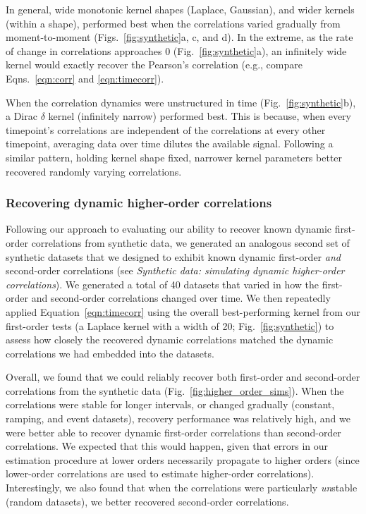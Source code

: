 \documentclass[english]{article}
\begin{document}
In general, wide monotonic kernel shapes (Laplace, Gaussian), and
wider kernels (within a shape), performed best when the correlations
varied gradually from moment-to-moment (Figs.~\ref{fig:synthetic}a, c,
and d).  In the extreme, as the rate of change in correlations
approaches 0 (Fig.~\ref{fig:synthetic}a), an infinitely wide kernel
would exactly recover the Pearson's correlation (e.g., compare
Eqns.~\ref{eqn:corr} and \ref{eqn:timecorr}).

When the correlation dynamics were unstructured in time
(Fig.~\ref{fig:synthetic}b), a Dirac $\delta$ kernel (infinitely
narrow) performed best.  This is because, when every timepoint's
correlations are independent of the correlations at every other
timepoint, averaging data over time dilutes the available signal.
Following a similar pattern, holding kernel shape fixed, narrower
kernel parameters better recovered randomly varying correlations.

\subsubsection*{Recovering dynamic higher-order correlations}
Following our approach to evaluating our ability to recover known
dynamic first-order correlations from synthetic data, we generated an
analogous second set of synthetic datasets that we designed to exhibit
known dynamic first-order \textit{and} second-order correlations (see
\textit{Synthetic data: simulating dynamic higher-order
  correlations}).  We generated a total of 40 datasets that varied in
how the first-order and second-order correlations changed over time.
We then repeatedly applied Equation~\ref{eqn:timecorr} using the
overall best-performing kernel from our first-order tests (a Laplace
kernel with a width of 20; Fig.~\ref{fig:synthetic}) to assess how
closely the recovered dynamic correlations matched the dynamic
correlations we had embedded into the datasets.

Overall, we found that we could reliably recover both first-order and
second-order correlations from the synthetic data
(Fig.~\ref{fig:higher_order_sims}).  When the correlations were stable
for longer intervals, or changed gradually (constant, ramping, and
event datasets), recovery performance was relatively high, and we were
better able to recover dynamic first-order correlations than
second-order correlations.  We expected that this would happen, given
that errors in our estimation procedure at lower orders necessarily
propagate to higher orders (since lower-order correlations are used to
estimate higher-order correlations).  Interestingly, we also found
that when the correlations were particularly \textit{un}stable (random
datasets), we better recovered second-order correlations.
\end{document}
